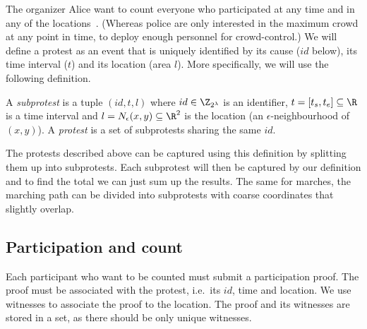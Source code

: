 
The organizer Alice want to count everyone who participated at any time and in 
any of the locations~\cite{2016DemonstrationsInSeoul}.
(Whereas police are only interested in the maximum crowd at any point in time, 
to deploy enough personnel for crowd-control.)
We will define a protest as an event that is uniquely identified by its cause 
(\(id\) below), its time interval (\(t\)) and its location (area \(l\)).
More specifically, we will use the following definition.

\begin{frame}
\begin{definition}[Protest]\label{DefProtest}
  A \emph{subprotest} is a tuple \((id, t, l)\) where
  \(id\in \Z_{2^\lambda}\) is an identifier,
  \(t = \interval{t_s}{t_e}\subseteq \R\) is a time interval and
  \(l = N_\epsilon(x, y)\subseteq \R^2\) is the location (an 
  \(\epsilon\)-neighbourhood of \((x,y)\)).
  A \emph{protest} is a set of subprotests sharing the same \(id\).
\end{definition}
\end{frame}

The protests described above can be captured using this definition by splitting 
them up into subprotests.
Each subprotest will then be captured by our definition and to find the total 
we can just sum up the results.
The same for marches, the marching path can be divided into subprotests with 
coarse coordinates that slightly overlap.

\subsection{Participation and count}

Each participant who want to be counted must submit a participation proof.
The proof must be associated with the protest, i.e.\ its \(id\), time and 
location.
We use witnesses to associate the proof to the location.
The proof and its witnesses are stored in a set, as there should be only unique 
witnesses.

